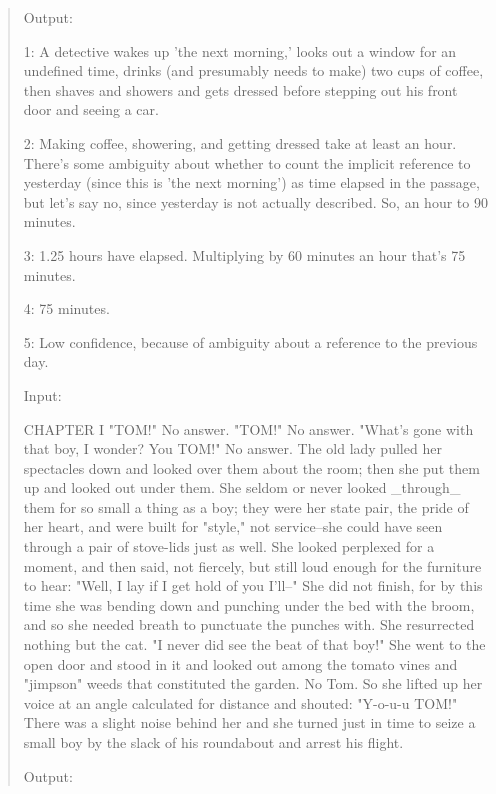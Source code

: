 \documentclass[12pt]{article}
\begin{document}
\begin{quote}
        Output:

        1: A detective wakes up 'the next morning,' looks out a window for an
        undefined time, drinks (and presumably needs to make) two cups of coffee,
        then shaves and showers and gets dressed before stepping out his front
        door and seeing a car.

        2: Making coffee, showering, and getting dressed take at least an hour.
        There's some ambiguity about whether to count the implicit reference to
        yesterday (since this is 'the next morning') as time elapsed in the
        passage, but let's say no, since yesterday is not actually described. So,
        an hour to 90 minutes.

        3: 1.25 hours have elapsed. Multiplying by 60 minutes an hour that's 75
        minutes.

        4: 75 minutes.

        5: Low confidence, because of ambiguity about a reference to the previous
        day.

        Input:

        CHAPTER I "TOM!" No answer. "TOM!" No answer. "What's gone with that boy,
        I wonder? You TOM!" No answer. The old lady pulled her spectacles down and
        looked over them about the room; then she put them up and looked out
        under them. She seldom or never looked \_through\_ them for so small a thing
        as a boy; they were her state pair, the pride of her heart, and were
        built for "style," not service--she could have seen through a pair of
        stove-lids just as well. She looked perplexed for a moment, and then
        said, not fiercely, but still loud enough for the furniture to hear: "Well,
        I lay if I get hold of you I'll--" She did not finish, for by this time she
        was bending down and punching under the bed with the broom, and so she
        needed breath to punctuate the punches with. She resurrected nothing but the
        cat. "I never did see the beat of that boy!" She went to the open door and
        stood in it and looked out among the tomato vines and "jimpson" weeds that
        constituted the garden. No Tom. So she lifted up her voice at an angle calculated
        for distance and shouted: "Y-o-u-u TOM!" There was a slight noise behind her
        and she turned just in time to seize a small boy by the slack of his roundabout
        and arrest his flight.

        Output:


\end{quote}
\end{document}

